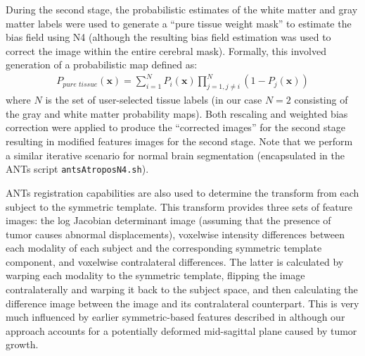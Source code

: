 \documentclass{llncs}
\begin{document}
During the second stage, the probabilistic estimates
of the white matter and gray matter labels were used to generate a
``pure tissue weight mask'' to estimate the bias field 
using N4 (although the resulting bias field estimation was used
to correct the image within the entire cerebral mask).  Formally, this 
involved generation of a probabilistic map defined as:
\begin{align}
  P_{pure\,\,tissue}(\mathbf{x}) = \sum_{i=1}^N P_i(\mathbf{x}) \prod_{j=1, j \neq i}^N \left( 1 - P_j(\mathbf{x}) \right)
\end{align}
where $N$ is the set of user-selected tissue labels (in our
case $N=2$ consisting of the gray and white matter probability
maps).
Both rescaling and weighted bias correction were applied to produce
the ``corrected images'' for the second stage resulting in
modified features images for the second stage.  Note that we
perform a similar iterative scenario for normal brain 
segmentation \cite{avants2011} (encapsulated in the ANTs script 
\verb#antsAtroposN4.sh#).


ANTs registration capabilities are also used to determine the transform from 
each subject to the symmetric template.  This transform provides three 
sets of feature images:  the log Jacobian determinant image (assuming that the 
presence of tumor causes abnormal displacements), voxelwise intensity differences between each modality of each subject and the corresponding symmetric template component, and voxelwise contralateral differences.  The latter is calculated by warping each modality to the symmetric template, flipping the image contralaterally 
and warping it back to the subject space, and then calculating the difference image
between the image and its contralateral counterpart.  This is very much influenced by earlier symmetric-based features described in \cite{geremia2011} although our approach accounts for a potentially deformed mid-sagittal plane caused by tumor growth.
\end{document}
